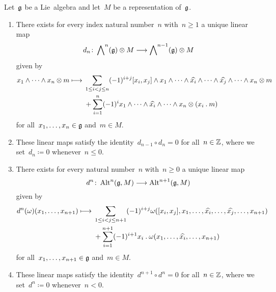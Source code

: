 \begin{proposition}
  Let~$\mathfrak{g}$ be a Lie~algebra and let~$M$ be a representation of~$\mathfrak{g}$.
  \begin{enumerate}
    \item
      There exists for every index natural number~$n$ with~$n \geq 1$ a unique linear map
      \[
        d_n
        \colon
        \Exterior^n(\glie) \otimes M
        \to
        \Exterior^{n-1}(\glie) \otimes M
      \]
      given by
      \begin{align*}
        x_1 \wedge \dotsb \wedge x_n \otimes m
        \mapsto
        {}&
        \sum_{1 \leq i < j \leq n}
        (-1)^{i+j}
        [x_i, x_j] \wedge x_1 \wedge \dotsb \wedge \widehat{x_i} \wedge \dotsb \wedge \widehat{x_j} \wedge \dotsb \wedge x_n \otimes m
        \\
        {}&
        +
        \sum_{i=1}^n
        (-1)^i
        x_1 \wedge \dotsb \wedge \widehat{x_i} \wedge \dotsb \wedge x_n \otimes (x_i \act m)
      \end{align*}
      for all~$x_1, \dotsc, x_n \in \mathfrak{g}$ and~$m \in M$.
    \item
      These linear maps satisfy the identity~$d_{n-1} \circ d_n = 0$ for all~$n \in \mathbb{Z}$, where we set~$d_n \coloneqq 0$ whenever~$n \leq 0$.
    \item
      There exists for every natural number~$n$ with~$n \geq 0$ a unique linear map
      \[
        d^n
        \colon
        \Alt^n(\glie, M)
        \to
        \Alt^{n+1}(\glie, M)
      \]
      given by
      \begin{align*}
        d^n(\omega)(x_1, \dotsc, x_{n+1})
        \mapsto
        {}&
        \sum_{1 \leq i < j \leq n+1}
        (-1)^{i+j} \omega([x_i, x_j], x_1, \dotsc, \widehat{x_i}, \dotsc, \widehat{x_j}, \dotsc, x_{n+1})
        \\
        {}&
        +
        \sum_{i=1}^{n+1}
        (-1)^{i+1}
        x_i \act \omega(x_1, \dotsc, \widehat{x_i}, \dotsc, x_{n+1})
      \end{align*}
      for all~$x_1, \dotsc, x_{n+1} \in \mathfrak{g}$ and~$m \in M$.
    \item
      These linear maps satisfy the identity~$d^{n+1} \circ d^n = 0$ for all~$n \in \mathbb{Z}$, where we set~$d^n \coloneqq 0$ whenever~$n < 0$.
  \end{enumerate}
\end{proposition}


